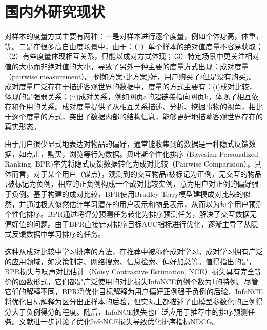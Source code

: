 \section{国内外研究现状}
\label{sec:requirement}
对样本的度量方式主要有两种：一是对样本进行逐个度量，例如个体身高，体重，等。二是在很多高自由度场景中，由于：（1）单个样本的绝对值度量不容易获取；（2）有些度量体现相互关系，只能以成对方式体现；（3）特定场景中更关注相对值的大小而非绝对值的大小，导致了另外一种主要的度量方式出现：成对度量（pairwise measurement）。 例如方案$i$比方案$j$好，用户购买了$i$但是没有购买$j$。成对度量广泛存在于描述客观世界的数据中，度量的方式主要有：(i)成对比较，体现的是强弱关系；(ii)成对关系，例如网页a的超链接指向网页b，体现了相互依存和作用的关系。成对度量提供了从相互关系描述、分析、挖掘事物的视角，相比于逐个度量的方式，突出了数据内部的结构信息，能够更好地描摹客观世界存在的真实形态。

由于用户很少显式地表达对物品的偏好，通常能收集到的数据是一种隐式反馈数据，如点击，购买，浏览等行为数据。贝叶斯个性化排序 (Bayesian Personalized Ranking, BPR)\cite{Steffen:2009:UAI}率先将隐式反馈数据转化为成对比较（Pairwise Comparision）。具体而言，对于某个用户（锚点），观测到的交互物品$i$被标记为正例，无交互的物品$j$被标记为负例，相应的正负例构成一个成对比较实例，意为用户对正例的偏好强于负例。基于构建的成对比较，BPR使用Bradley-Terry模型\cite{Bradley:1952:Biometrika,Luce:2005:JASA}建模成对比较的似然，并通过极大似然估计学习潜在的用户表示和物品表示，从而以为每个用户预测个性化排序。BPR通过将评分预测任务转化为排序预测任务，解决了交互数据无偏好值的问题。由于BPR直接针对排序目标AUC指标进行优化，逐渐主导了从隐式反馈数据中学习排序的任务\cite{Weike:2013:IJCAI,Yu:2018:CIKM,Xiaoye:2011:MathProg,Xuejiao:2020:ASC,Qiu:2018:IS,Zhao:2019:FGCS}。

这种从成对比较中学习排序的方法，在推荐中被称作成对学习。成对学习拥有广泛的应用领域\cite{Bradley:1952:Biometrika,Maystre:2017:ICML,Yang:2020:IS}，如决策制定\cite{McFadden:1974:FE}、网络搜索\cite{Dwork:2001:WWW}、信息检索\cite{Ai:2018:SIGIR}、偏好加总\cite{Arrow:2012}等。值得指出的是，BPR损失与噪声对比估计\cite{Gutmann:2010:ICAIS,gutmann:2012:JMLR}（Noisy Contrastive Estimation, NCE）损失具有完全等价的函数形式\cite{Liu:2021:TKDE}，它们都是广泛使用的对比损失InfoNCE\cite{Oord:2018:arxiv}负例个数为1的特例。尽管它们的解释不同，BPR将优化目标解释为用户偏好正例强于负例的后验，InfoNCE将优化目标解释为区分出正样本的后验，但实际上都描述了由模型参数化的正例得分大于负例得分的程度。随后，InfoNCE损失也广泛应用于推荐中的排序预测任务\cite{Jiancan:2022:arxiv,lightgcl:2023:ICLR}。文献\cite{Jiancan:2022:arxiv}进一步讨论了优化InfoNCE损失导致优化排序指标NDCG。

